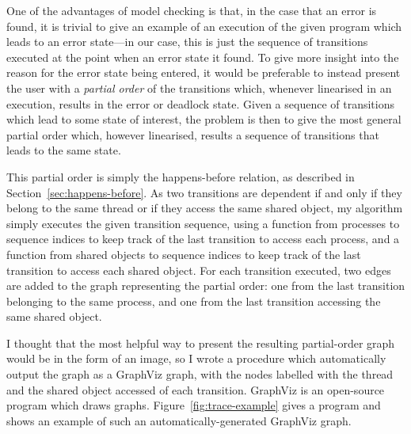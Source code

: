 \documentclass[12pt,a4paper,twoside,openright]{report}
\begin{document}
One of the advantages of model checking
is that, in the case that
an error is found, it is trivial to give
an example of an execution of the given
program which leads to an error state---in
our case, this is just the sequence of
transitions executed at the point when
an error state it found.
To give more insight into the reason for the
error state being entered, it would be preferable
to instead present the user with a
\emph{partial order} of the transitions which,
whenever linearised in an execution,
results in the error or deadlock state.
Given a sequence of transitions which lead to
some state of interest, the problem is
then to give the most general partial order
which, however linearised, results a sequence
of transitions that leads to the same state.

This partial order is simply the happens-before
relation, as described in
Section~\ref{sec:happens-before}. As
two transitions are dependent if and only
if they belong to the same thread or if
they access the same shared object, my
algorithm simply executes the given transition
sequence, using a function from processes
to sequence indices to keep track
of the last transition to access each
process, and a function from shared
objects to sequence indices to keep
track of the last transition to
access each shared object. For each
transition executed, two edges are added
to the graph representing the partial
order: one from the last transition
belonging to the same process, and one
from the last transition accessing the
same shared object.

I thought that the most helpful way to
present the resulting partial-order
graph would be in the form of an
image, so I wrote a procedure which
automatically output the graph as
a GraphViz graph, with the nodes
labelled with the thread and the
shared object accessed of each transition.
GraphViz is an open-source program which
draws graphs.
Figure~\ref{fig:trace-example} gives a program
and shows an example of such an
automatically-generated GraphViz graph.
\end{document}
